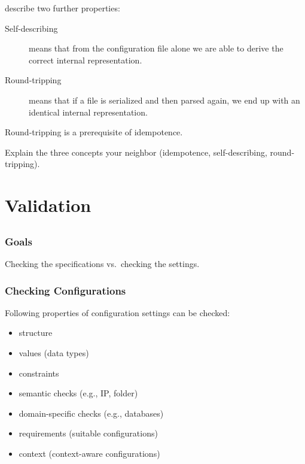 \begin{frame}
	\citet{wadler2003xml} describe two further properties:
	\vspace{2em}

	\begin{description}
	\item[Self-describing]
	means that from the configuration file alone we are able to derive the correct internal representation.

	\item[Round-tripping]
	means that if a file is serialized and then parsed again, we end up with an identical internal representation.
	\end{description}

	\pause

	\vspace{2em}
	Round-tripping is a prerequisite of idempotence.

	\pause

	\begin{task}
	Explain the three concepts your neighbor (idempotence, self-describing, round-tripping).
	\end{task}
\end{frame}


\section{Validation}

\subsection{}

\begin{frame}
	\frametitle{Goals}

	Checking the specifications vs.\ checking the settings.

\end{frame}

\begin{frame}
	\frametitle{Checking Configurations}

	Following properties of configuration settings can be checked:

	\begin{itemize}[<+-| alert@+>]
	\item structure
	\item values (data types)
	\item constraints
	\item semantic checks (e.g., IP, folder)
	\item domain-specific checks (e.g., databases)
	\item requirements (suitable configurations)
	\item context (context-aware configurations)
	\end{itemize}
\end{frame}

